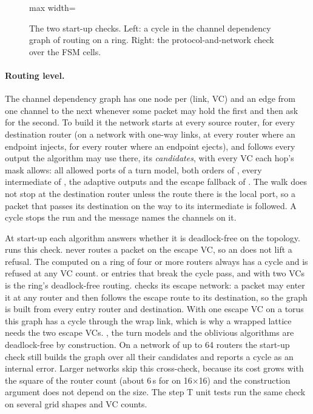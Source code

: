 \begin{figure}[htbp]\centering
\begin{adjustbox}{max width=\textwidth}\end{adjustbox}
\caption{The two start-up checks. Left: a cycle in the channel dependency graph of
 routing on a ring. Right: the protocol-and-network check over the FSM cells.}
\label{fig:noc-deadlock}
\end{figure}

\paragraph{Routing level.} The channel dependency graph has one node per (link, VC) and an edge
from one channel to the next whenever some packet may hold the first and then ask for the second.
To build it the network starts at every source router, for every destination router (on a
network with one-way links, at every router where an endpoint injects, for every router where
an endpoint ejects), and follows
every output the algorithm may use there, its \emph{candidates}, with every VC each hop's mask
allows: all allowed ports of a turn model, both orders of , every intermediate of
, the adaptive outputs and the escape fallback of . The walk
does not stop at the destination router unless the route there is the local port, so a
 packet that passes its destination on the way to its intermediate is followed. A
cycle stops the run and the message names the channels on it.

At start-up each algorithm answers whether it is deadlock-free on the topology.  runs
this check.  never routes a packet on the escape VC, so an  does not
lift a refusal. The computed  on a ring of four or more routers always has a cycle
and is refused at any VC count.  or  entries that break the
cycle pass, and  with two VCs is the ring's deadlock-free routing. 
checks its escape network: a packet may enter it at any router and then follows the escape route
to its destination, so the graph is built from every entry router and destination. With one escape
VC on a torus this graph has a cycle through the wrap link, which is why a wrapped lattice needs
the two escape VCs. , the turn models and the oblivious algorithms are deadlock-free by
construction. On a network of up to 64 routers the start-up check still builds the graph over
all their candidates and reports a cycle as an internal error. Larger networks skip this
cross-check, because its cost grows with the square of the router count (about 6\,s for
 on 16$\times$16) and the construction argument does not depend on the size. The
step T unit tests run the same check on several grid shapes and VC counts.

